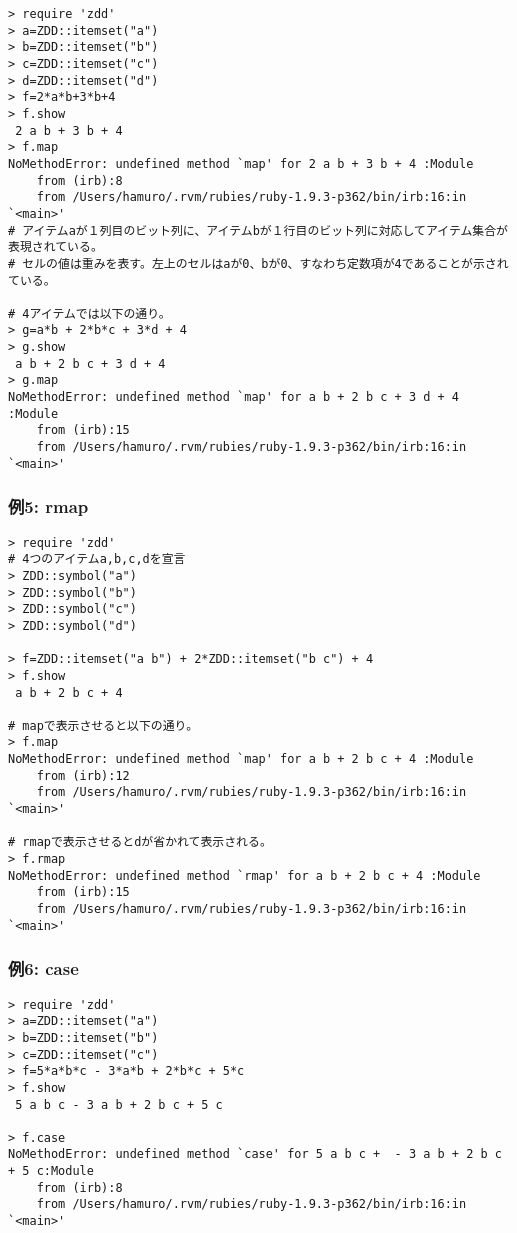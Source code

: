\begin{Verbatim}[baselinestretch=0.7,frame=single]
> require 'zdd'
> a=ZDD::itemset("a")
> b=ZDD::itemset("b")
> c=ZDD::itemset("c")
> d=ZDD::itemset("d")
> f=2*a*b+3*b+4
> f.show
 2 a b + 3 b + 4
> f.map
NoMethodError: undefined method `map' for 2 a b + 3 b + 4 :Module
	from (irb):8
	from /Users/hamuro/.rvm/rubies/ruby-1.9.3-p362/bin/irb:16:in `<main>'
# アイテムaが１列目のビット列に、アイテムbが１行目のビット列に対応してアイテム集合が表現されている。
# セルの値は重みを表す。左上のセルはaが0、bが0、すなわち定数項が4であることが示されている。

# 4アイテムでは以下の通り。
> g=a*b + 2*b*c + 3*d + 4
> g.show
 a b + 2 b c + 3 d + 4
> g.map
NoMethodError: undefined method `map' for a b + 2 b c + 3 d + 4 :Module
	from (irb):15
	from /Users/hamuro/.rvm/rubies/ruby-1.9.3-p362/bin/irb:16:in `<main>'
\end{Verbatim}
\subsubsection*{例5: rmap}



\begin{Verbatim}[baselinestretch=0.7,frame=single]
> require 'zdd'
# 4つのアイテムa,b,c,dを宣言
> ZDD::symbol("a")
> ZDD::symbol("b")
> ZDD::symbol("c")
> ZDD::symbol("d")

> f=ZDD::itemset("a b") + 2*ZDD::itemset("b c") + 4
> f.show
 a b + 2 b c + 4

# mapで表示させると以下の通り。
> f.map
NoMethodError: undefined method `map' for a b + 2 b c + 4 :Module
	from (irb):12
	from /Users/hamuro/.rvm/rubies/ruby-1.9.3-p362/bin/irb:16:in `<main>'

# rmapで表示させるとdが省かれて表示される。
> f.rmap
NoMethodError: undefined method `rmap' for a b + 2 b c + 4 :Module
	from (irb):15
	from /Users/hamuro/.rvm/rubies/ruby-1.9.3-p362/bin/irb:16:in `<main>'
\end{Verbatim}
\subsubsection*{例6: case}



\begin{Verbatim}[baselinestretch=0.7,frame=single]
> require 'zdd'
> a=ZDD::itemset("a")
> b=ZDD::itemset("b")
> c=ZDD::itemset("c")
> f=5*a*b*c - 3*a*b + 2*b*c + 5*c
> f.show
 5 a b c - 3 a b + 2 b c + 5 c

> f.case
NoMethodError: undefined method `case' for 5 a b c +  - 3 a b + 2 b c + 5 c:Module
	from (irb):8
	from /Users/hamuro/.rvm/rubies/ruby-1.9.3-p362/bin/irb:16:in `<main>'
\end{Verbatim}
